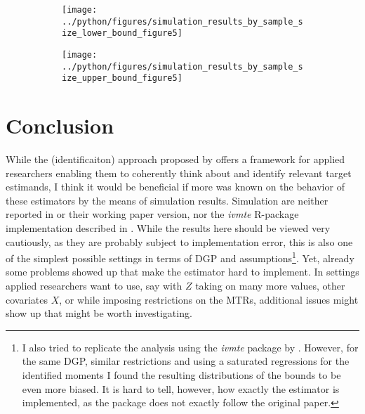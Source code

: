 \documentclass[11pt, a4paper, leqno]{article}
\begin{document}
\clearpage
\newpage

\begin{figure}[H]
    \caption{Distribution of Estimator for $LATE(0.35, 0.9)$ by $N$ \label{fig:histos}}
     \centering

     \begin{subfigure}[b]{0.49\textwidth}
         \centering
         \texttt{[image: ../python/figures/simulation\_results\_by\_sample\_size\_lower\_bound\_figure5]}
     \end{subfigure}
    \hfill
     \begin{subfigure}[b]{0.49\textwidth}
         \centering
         \texttt{[image: ../python/figures/simulation\_results\_by\_sample\_size\_upper\_bound\_figure5]}
        \end{subfigure}


\end{figure}
\clearpage
\newpage

\section{Conclusion}
While the (identificaiton) approach proposed by \citet{mogstad2018using} offers a framework for applied researchers enabling them to coherently think about and identify relevant target estimands, I think it would be beneficial if more was known on the behavior of these estimators by the means of simulation results.
Simulation are neither reported in \citet{mogstad2018using} or their working paper version, nor the \textit{ivmte} R-package implementation described in \citet{shea2021ivmte}.
While the results here should be viewed very cautiously, as they are probably subject to implementation error, this is also one of the simplest possible settings in terms of DGP and assumptions\footnote{I also tried to replicate the analysis using the \textit{ivmte} package by \citet{shea2021ivmte}. However, for the same DGP, similar restrictions and using a saturated regressions for the identified moments I found the resulting distributions of the bounds to be even more biased. It is hard to tell, however, how exactly the estimator is implemented, as the package does not exactly follow the original \citet{mogstad2018using} paper.}. Yet, already some problems showed up that make the estimator hard to implement.
In settings applied researchers want to use, say with $Z$ taking on many more values, other covariates $X$, or while imposing restrictions on the MTRs, additional issues might show up that might be worth investigating.
\end{document}
